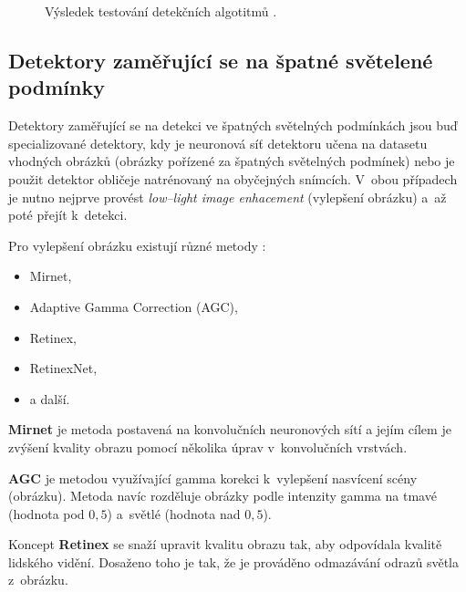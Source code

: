 \begin{figure}[H]
  \begin{center}
  \label{obrazek:cnncomparison}
  \caption{Výsledek testování detekčních algotitmů \cite{fdCNNComparison}.}
  \end{center}
\end{figure}

\subsection*{Detektory zaměřující se na špatné světelené podmínky}
Detektory zaměřující se na detekci ve špatných světelných podmínkách jsou buď specializované detektory, kdy je neuronová síť detektoru učena na datasetu vhodných obrázků (obrázky pořízené za špatných světelných podmínek) nebo je použit detektor obličeje natrénovaný na obyčejných snímcích. V~obou případech je nutno nejprve provést \emph{low--light image enhacement} (vylepšení obrázku) a~až poté přejít k~detekci.

Pro vylepšení obrázku existují různé metody \cite{lowLightFdReview}:
\begin{itemize}
  \item Mirnet,
  \item Adaptive Gamma Correction (AGC),
  \item Retinex,
  \item RetinexNet,
  \item a další.
\end{itemize}

\textbf{Mirnet} je metoda postavená na konvolučních neuronových sítí a jejím cílem je zvýšení kvality obrazu pomocí několika úprav v~konvolučních vrstvách.

\textbf{AGC} je metodou využívající gamma korekci k~vylepšení nasvícení scény (obrázku). Metoda navíc rozděluje obrázky podle intenzity gamma na tmavé (hodnota pod $0,5$) a~světlé (hodnota nad $0,5$).

Koncept \textbf{Retinex} se snaží upravit kvalitu obrazu tak, aby odpovídala kvalitě lidského vidění. Dosaženo toho je tak, že je prováděno odmazávání odrazů světla z~obrázku.

